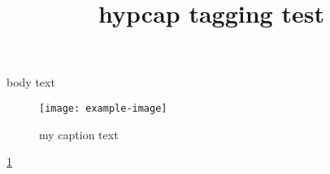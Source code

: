 \documentclass{article}
\title{hypcap tagging test}
\begin{document}
body text
\begin{figure}
\texttt{[image: example-image]}
\caption{my caption text}
\label{fig}
\end{figure}

\ref{fig}
\end{document}

